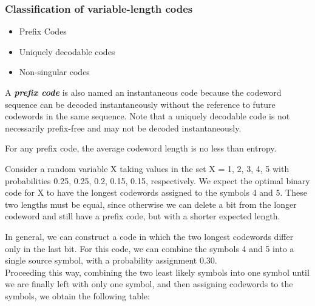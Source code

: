 \begin{frame}
\frametitle{Classification of variable-length codes}

\begin{itemize}
	\item Prefix Codes
	\item Uniquely decodable codes
	\item Non-singular codes
\end{itemize}

A \textbf{\emph{prefix code}} is also named an instantaneous code because the codeword sequence can be decoded instantaneously without the reference to future codewords
in the same sequence. Note that a uniquely decodable code is not necessarily
prefix-free and may not be decoded instantaneously.

For any prefix code, the average codeword length is no less than entropy.
\end{frame}


\begin{frame}
Consider a random variable X taking values in the set
X = {1, 2, 3, 4, 5} with probabilities 0.25, 0.25, 0.2, 0.15, 0.15, respectively.
We expect the optimal binary code for X to have the longest
codewords assigned to the symbols 4 and 5. These two lengths must be
equal, since otherwise we can delete a bit from the longer codeword and
still have a prefix code, but with a shorter expected length.


\end{frame}



\begin{frame} In general,
we can construct a code in which the two longest codewords differ only
in the last bit. For this code, we can combine the symbols 4 and 5 into
a single source symbol, with a probability assignment 0.30. \\ Proceeding
this way, combining the two least likely symbols into one symbol until
we are finally left with only one symbol, and then assigning codewords
to the symbols, we obtain the following table:


\end{frame}

